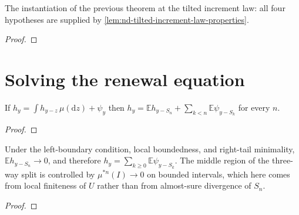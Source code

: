 \begin{theorem}
  \label{thm:nd-key-renewal-tilted}
  \leanok
  The instantiation of the previous theorem at the tilted increment law: all
  four hypotheses are supplied by
  \cref{lem:nd-tilted-increment-law-properties}.
\end{theorem}
\begin{proof}\leanok\end{proof}

\section{Solving the renewal equation}

\begin{lemma}
  \label{lem:nd-renewal-iteration}
  \leanok
  If $h_y=\int h_{y-z}\,\mu(\mathrm dz)+\psi_y$ then
  $h_y=\mathbb E h_{y-S_n}+\sum_{k<n}\mathbb E\psi_{y-S_k}$ for every $n$.
\end{lemma}
\begin{proof}\leanok\end{proof}

\begin{lemma}
  \label{lem:nd-renewal-terminal}
  \leanok
  Under the left-boundary condition, local boundedness, and right-tail
  minimality, $\mathbb E h_{y-S_n}\to0$, and therefore
  $h_y=\sum_{k\ge0}\mathbb E\psi_{y-S_k}$.  The middle region of the three-way
  split is controlled by $\mu^{*n}(I)\to0$ on bounded intervals, which here
  comes from local finiteness of $U$ rather than from almost-sure divergence of
  $S_n$.
\end{lemma}
\begin{proof}\leanok\end{proof}

